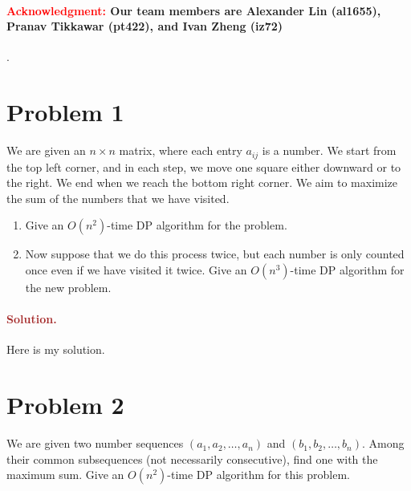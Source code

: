 \paragraph{\textcolor{red}{Acknowledgment:} Our team members are \textbf{Alexander Lin (al1655)}, \textbf{Pranav Tikkawar (pt422)}, and \textbf{Ivan Zheng (iz72)}}.

\section*{Problem 1}
We are given an $n \times n$ matrix, where each entry $a_{ij}$ is a number.
We start from the top left corner, and in each step, we move one square either downward or to the right. We end when we reach the bottom right corner. We aim to maximize the sum of the numbers that we have visited.
\begin{enumerate}
    \item Give an $O(n^2)$-time DP algorithm for the problem.
    \item Now suppose that we do this process twice, but each number is only counted once even if we have visited it twice. Give an $O(n^3)$-time DP algorithm for the new problem.
\end{enumerate}

\paragraph{\textcolor{brown}{Solution.}}
Here is my solution.


\section*{Problem 2}
We are given two number sequences $(a_1, a_2, \ldots, a_n)$ and $(b_1, b_2, \ldots, b_n)$. Among their common subsequences (not necessarily consecutive), find one with the maximum sum. Give an $O(n^2)$-time DP algorithm for this problem.

